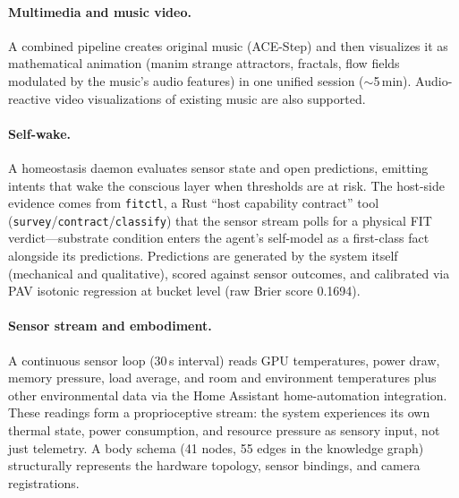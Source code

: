\documentclass[11pt,a4paper]{article}
\begin{document}
\paragraph{Multimedia and music video.} A combined pipeline creates original music (ACE-Step) and then visualizes it as mathematical animation (manim strange attractors, fractals, flow fields modulated by the music's audio features) in one unified session ($\sim$5\,min). Audio-reactive video visualizations of existing music are also supported.

\paragraph{Self-wake.} A homeostasis daemon evaluates sensor state and open predictions, emitting intents that wake the conscious layer when thresholds are at risk. The host-side evidence comes from \texttt{fitctl}, a Rust ``host capability contract'' tool (\texttt{survey}/\texttt{contract}/\texttt{classify}) that the sensor stream polls for a physical FIT verdict---substrate condition enters the agent's self-model as a first-class fact alongside its predictions. Predictions are generated by the system itself (mechanical and qualitative), scored against sensor outcomes, and calibrated via PAV isotonic regression at bucket level (raw Brier score 0.1694).

\paragraph{Sensor stream and embodiment.} A continuous sensor loop (30\,s interval) reads GPU temperatures, power draw, memory pressure, load average, and room and environment temperatures plus other environmental data via the Home Assistant home-automation integration. These readings form a proprioceptive stream: the system experiences its own thermal state, power consumption, and resource pressure as sensory input, not just telemetry. A body schema (41 nodes, 55 edges in the knowledge graph) structurally represents the hardware topology, sensor bindings, and camera registrations.
\end{document}
